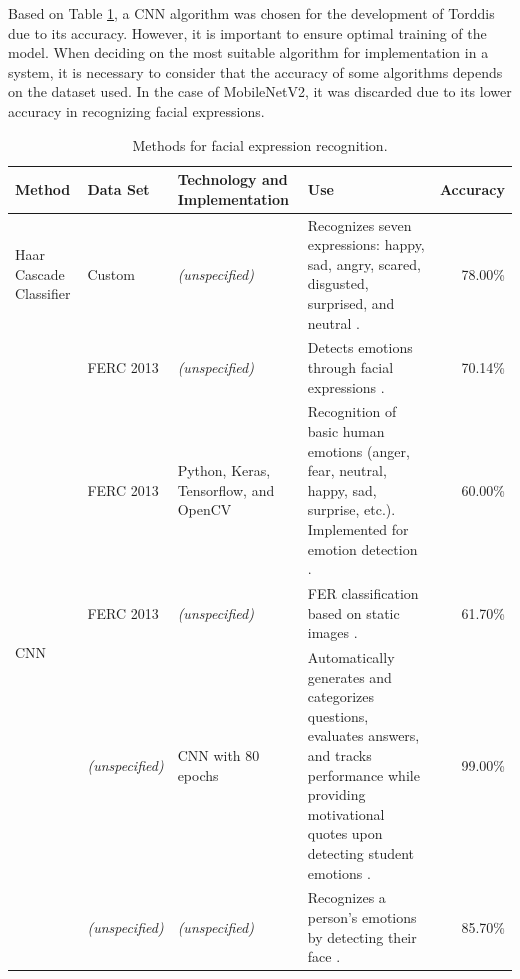 \documentclass[a4paper,fleqn]{cas-sc}
\begin{document}
					Based on Table \ref{tab:facial-expression}, a CNN algorithm was chosen for the development of Torddis due to its accuracy. However, it is important to ensure optimal training of the model. When deciding on the most suitable algorithm for implementation in a system, it is necessary to consider that the accuracy of some algorithms depends on the dataset used. In the case of MobileNetV2, it was discarded due to its lower accuracy in recognizing facial expressions.
					
					\begin{table}[H]
						\caption{Methods for facial expression recognition.}
						\label{tab:facial-expression}
						\centering
						\begin{tabular}{p{}p{}p{}p{}p{}}
							\hline
							\multicolumn{1}{l}{\textbf{Method}} & \multicolumn{1}{l}{\textbf{Data Set}} & \multicolumn{1}{l}{\textbf{Technology and Implementation}} & \multicolumn{1}{l}{\textbf{Use}} & \multicolumn{1}{l}{\textbf{Accuracy}} \\ \hline
							Haar Cascade Classifier & Custom & \textit{(unspecified)} & Recognizes seven expressions: happy, sad, angry, scared, disgusted, surprised, and neutral \citep{Lalitha2021ADeep}. & \multicolumn{1}{r}{78.00\%} \\
							\multirow{7}{*}{CNN} & FERC 2013 & \textit{(unspecified)} & Detects emotions through facial expressions \citep{Jaiswal2020Facial}. & \multicolumn{1}{r}{70.14\%} \\
							& FERC 2013 & Python, Keras, Tensorflow, and OpenCV & Recognition of basic human emotions (anger, fear, neutral, happy, sad, surprise, etc.). Implemented for emotion detection \citep{Kedari2021Face}. & \multicolumn{1}{r}{60.00\%} \\
							& FERC 2013 & \textit{(unspecified)} & FER classification based on static images \citep{Singh2020Facial}. & \multicolumn{1}{r}{61.70\%} \\
							& \textit{(unspecified)} & CNN with 80 epochs & Automatically generates and categorizes questions, evaluates answers, and tracks performance while providing motivational quotes upon detecting student emotions \citep{Silva2021AI}. & \multicolumn{1}{r}{99.00\%} \\
							& \textit{(unspecified)} & \textit{(unspecified)} & Recognizes a person's emotions by detecting their face \citep{Bikku2022Emotion}. & \multicolumn{1}{r}{85.70\%} \\ 

\end{tabular}
\end{table}
\end{document}
